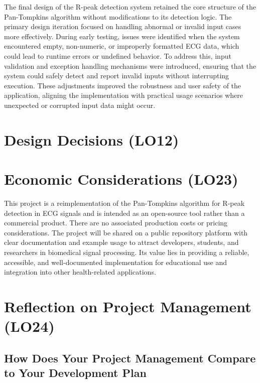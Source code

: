 \documentclass{article}
\begin{document}
The final design of the R-peak detection system retained the core structure of
the Pan-Tompkins algorithm without modifications to its detection logic. The
primary design iteration focused on handling abnormal or invalid input cases
more effectively. During early testing, issues were identified when the system
encountered empty, non-numeric, or improperly formatted ECG data, which could
lead to runtime errors or undefined behavior. To address this, input validation
and exception handling mechanisms were introduced, ensuring that the system
could safely detect and report invalid inputs without interrupting execution.
These adjustments improved the robustness and user safety of the application,
aligning the implementation with practical usage scenarios where unexpected or
corrupted input data might occur.

\section{Design Decisions (LO12)}


\section{Economic Considerations (LO23)}

This project is a reimplementation of the Pan-Tompkins algorithm for R-peak
detection in ECG signals and is intended as an open-source tool rather than a
commercial product. There are no associated production costs or pricing
considerations. The project will be shared on a public repository platform with
clear documentation and example usage to attract developers, students, and
researchers in biomedical signal processing. Its value lies in providing a
reliable, accessible, and well-documented implementation for educational use and
integration into other health-related applications.

\section{Reflection on Project Management (LO24)}

\subsection{How Does Your Project Management Compare to Your Development Plan}
\end{document}
